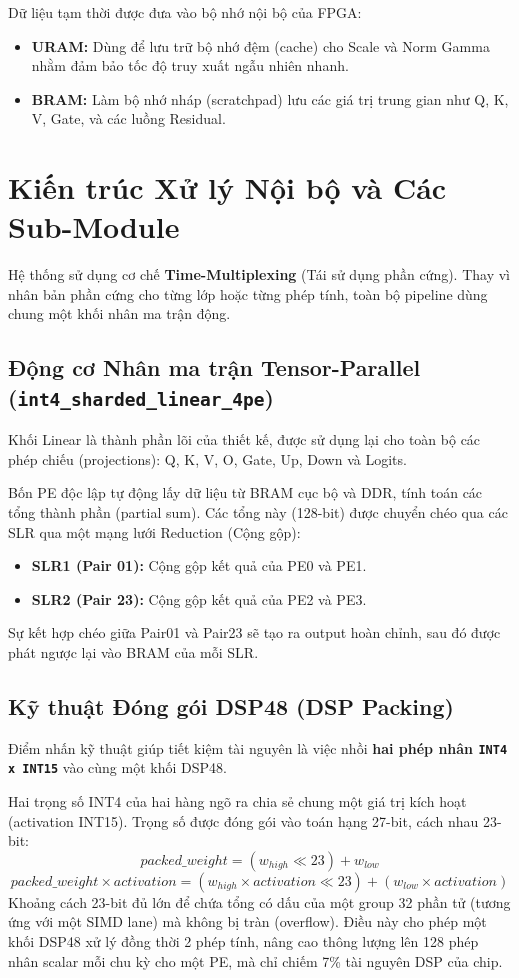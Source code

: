 \documentclass[12pt,a4paper]{article}
\begin{document}
Dữ liệu tạm thời được đưa vào bộ nhớ nội bộ của FPGA:
\begin{itemize}
    \item \textbf{URAM:} Dùng để lưu trữ bộ nhớ đệm (cache) cho Scale và Norm Gamma nhằm đảm bảo tốc độ truy xuất ngẫu nhiên nhanh.
    \item \textbf{BRAM:} Làm bộ nhớ nháp (scratchpad) lưu các giá trị trung gian như Q, K, V, Gate, và các luồng Residual.
\end{itemize}

\section{Kiến trúc Xử lý Nội bộ và Các Sub-Module}
Hệ thống sử dụng cơ chế \textbf{Time-Multiplexing} (Tái sử dụng phần cứng). Thay vì nhân bản phần cứng cho từng lớp hoặc từng phép tính, toàn bộ pipeline dùng chung một khối nhân ma trận động.

\subsection{Động cơ Nhân ma trận Tensor-Parallel (\texttt{int4\_sharded\_linear\_4pe})}
Khối Linear là thành phần lõi của thiết kế, được sử dụng lại cho toàn bộ các phép chiếu (projections): Q, K, V, O, Gate, Up, Down và Logits. 

Bốn PE độc lập tự động lấy dữ liệu từ BRAM cục bộ và DDR, tính toán các tổng thành phần (partial sum). Các tổng này (128-bit) được chuyển chéo qua các SLR qua một mạng lưới Reduction (Cộng gộp):
\begin{itemize}
    \item \textbf{SLR1 (Pair 01):} Cộng gộp kết quả của PE0 và PE1.
    \item \textbf{SLR2 (Pair 23):} Cộng gộp kết quả của PE2 và PE3.
\end{itemize}
Sự kết hợp chéo giữa Pair01 và Pair23 sẽ tạo ra output hoàn chỉnh, sau đó được phát ngược lại vào BRAM của mỗi SLR.

\subsection{Kỹ thuật Đóng gói DSP48 (DSP Packing)}
Điểm nhấn kỹ thuật giúp tiết kiệm tài nguyên là việc nhồi \textbf{hai phép nhân \texttt{INT4 x INT15}} vào cùng một khối DSP48. 

Hai trọng số INT4 của hai hàng ngõ ra chia sẻ chung một giá trị kích hoạt (activation INT15). Trọng số được đóng gói vào toán hạng 27-bit, cách nhau 23-bit:
\begin{equation}
    packed\_weight = (w_{high} \ll 23) + w_{low}
\end{equation}
\begin{equation}
    packed\_weight \times activation = (w_{high} \times activation \ll 23) + (w_{low} \times activation)
\end{equation}
Khoảng cách 23-bit đủ lớn để chứa tổng có dấu của một group 32 phần tử (tương ứng với một SIMD lane) mà không bị tràn (overflow). Điều này cho phép một khối DSP48 xử lý đồng thời 2 phép tính, nâng cao thông lượng lên 128 phép nhân scalar mỗi chu kỳ cho một PE, mà chỉ chiếm 7\% tài nguyên DSP của chip.
\end{document}

